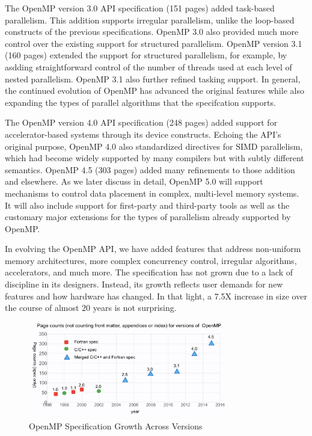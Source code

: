 The OpenMP version 3.0 API specification (151 pages) added task-based 
parallelism. This addition supports irregular parallelism, unlike the 
loop-based constructs of the previous specifications. OpenMP 3.0 also
provided much more control over the existing support for structured
parallelism. OpenMP version 3.1 (160 pages) extended the support for 
structured parallelism, for example, by asdding straightforward control
of the number of threads used at each level of nested parallelism. 
OpenMP 3.1 also further refined tasking support. In general, the 
continued evolution of OpenMP has advanced the original features 
while also expanding the types of parallel algorithms that the 
specifcation supports.

The OpenMP version 4.0 API specification (248 pages) added support for 
accelerator-based systems through its device constructs. Echoing the API's 
original purpose, OpenMP 4.0 also standardized directives for SIMD 
parallelism, which had become widely supported by many compilers but 
with subtly different semantics. OpenMP 4.5 (303 pages) added many 
refinements to those addition and elsewhere. As we later discuss in 
detail, OpenMP 5.0 will support mechanisms to control data placement in
complex, multi-level memory systems. It will also include support for
first-party and third-party tools as well as the customary major 
extensions for the types of parallelism already supported by OpenMP.

In evolving the OpenMP API, we have added features that address 
non-uniform memory architectures, more complex concurrency control, 
irregular algorithms, accelerators, and much more. The specification 
has not grown due to a lack of discipline in its designers. Instead,
its growth reflects user demands for new features and how hardware 
has changed. In that light, a 7.5X increase in size over the course 
of almost 20 years is not surprising.

\begin{figure}
  \centering
  \includegraphics[width=3.4in]{pics/opcounts.png}
  \caption{OpenMP Specification Growth Across Versions}
  \label{omppcount}
\end{figure}


